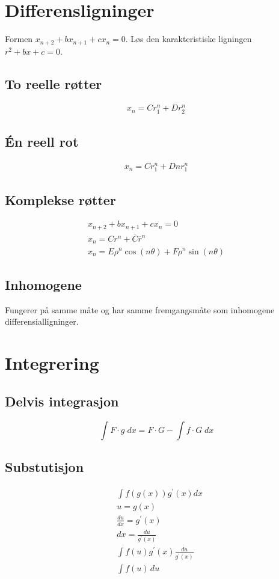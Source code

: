 \documentclass[defaultpackages]{cheatsheet}
\begin{document}
	\section{Differensligninger}
	Formen $x_{n+2} + bx_{n+1}+cx_n=0$. Løs den karakteristiske ligningen $r^2+bx + c = 0$.
	\subsection{To reelle røtter}
	\begin{gather*}
		x_{n} = Cr_1^n+Dr_2^n
	\end{gather*}
	\subsection{\'En reell rot}
		\begin{gather*}
			x_n = Cr_1^n+Dnr_1^n
		\end{gather*}
	\subsection{Komplekse røtter}
	\begin{gather*}
		x_{n+2} + bx_{n+1}+cx_n=0\\
		x_n = Cr^n+\overline{C}\overline{r}^n\tag{reelle løsninger}\\
		x_n = E\rho^n\cos(n\theta)+F\rho^n\sin(n\theta)\tag{trigonmetrisk form for reelle løsninger}
	\end{gather*}
	\subsection{Inhomogene}
	Fungerer på samme måte og har samme fremgangsmåte som inhomogene differensialligninger.
	\section{Integrering}

	\subsection{Delvis integrasjon}
	\phantom{}
	\[\int F\cdot g \;dx = F\cdot G-\int f\cdot G\;dx\]
	\subsection{Substutisjon}
	\phantom{}
	\begin{align*}
		&\int f(g(x))g^\prime(x)dx\\
		& u = g(x)\\
		& \frac{du}{dx} = g^\prime(x)\\
		& dx = \frac{du}{g^\prime(x)}\\
		& \int f(u)g^\prime(x) \frac{du}{g^\prime(x)}\\
		& \int f(u)\,du
	\end{align*}
\end{document}
